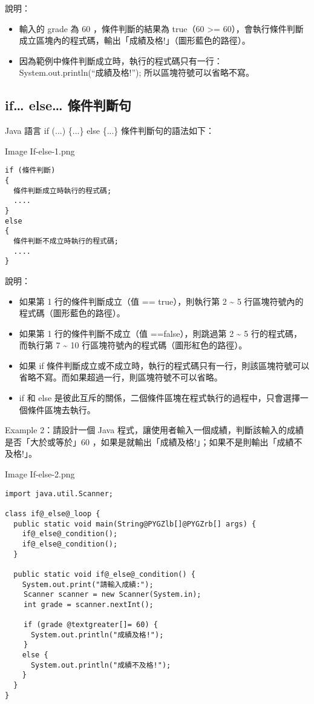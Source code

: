 \documentclass[a4paper,12pt,english]{sphinxmanual}
\begin{document}
說明：
\begin{itemize}
\item {} 
輸入的 grade 為 60 ，條件判斷的結果為 true（60 \textgreater{}= 60），會執行條件判斷成立區塊內的程式碼，輸出「成績及格!」（圖形藍色的路徑）。

\item {} 
因為範例中條件判斷成立時，執行的程式碼只有一行： System.out.println(``成績及格!''); 所以區塊符號可以省略不寫。

\end{itemize}


\subsection{if… else… 條件判斷句}
\label{java_cond:if-else}
Java 語言 if (...) \{...\} else \{...\} 條件判斷句的語法如下：

Image If-else-1.png

\begin{Verbatim}[commandchars=@\[\]]
if (條件判斷)
{
  條件判斷成立時執行的程式碼;
  ....
}
else
{
  條件判斷不成立時執行的程式碼;
  ....
}
\end{Verbatim}

說明：
\begin{itemize}
\item {} 
如果第 1 行的條件判斷成立（值 == true），則執行第 2 \textasciitilde{} 5 行區塊符號內的程式碼（圖形藍色的路徑）。

\item {} 
如果第 1 行的條件判斷不成立（值 ==false），則跳過第 2 \textasciitilde{} 5 行的程式碼，而執行第 7 \textasciitilde{} 10 行區塊符號內的程式碼（圖形紅色的路徑）。

\item {} 
如果 if 條件判斷成立或不成立時，執行的程式碼只有一行，則該區塊符號可以省略不寫。而如果超過一行，則區塊符號不可以省略。

\item {} 
if 和 else 是彼此互斥的關係，二個條件區塊在程式執行的過程中，只會選擇一個條件區塊去執行。

\end{itemize}

Example 2：請設計一個 Java 程式，讓使用者輸入一個成績，判斷該輸入的成績是否「大於或等於」60 ，如果是就輸出「成績及格!」；如果不是則輸出「成績不及格!」。

Image If-else-2.png

\begin{Verbatim}[commandchars=@\[\]]
import java.util.Scanner;

class if@_else@_loop {
  public static void main(String@PYGZlb[]@PYGZrb[] args) {
    if@_else@_condition();
    if@_else@_condition();
  }

  public static void if@_else@_condition() {
    System.out.print("請輸入成績:");
　　 Scanner scanner = new Scanner(System.in);
　　 int grade = scanner.nextInt();

　　 if (grade @textgreater[]= 60) {
      System.out.println("成績及格!");
　　 }
    else {
      System.out.println("成績不及格!");
    }
  }
}
\end{Verbatim}
\end{document}
